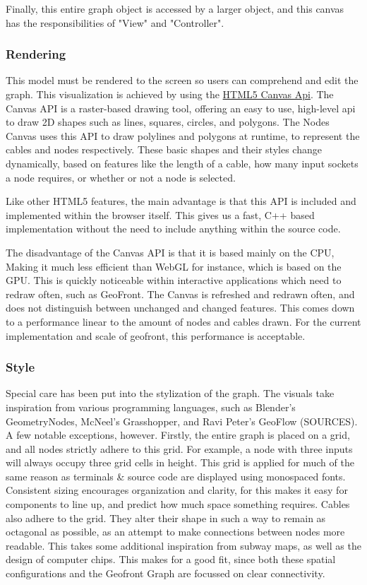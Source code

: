 Finally, this entire graph object is accessed by a larger  object, and this canvas has the responsibilities of "View" and "Controller". 

\subsubsection*{ Rendering }
This model must be rendered to the screen so users can comprehend and edit the graph. 
This visualization is achieved by using the \href{https://developer.mozilla.org/en-US/docs/Web/API/Canvas_API}{HTML5 Canvas Api}. 
The Canvas API is a raster-based drawing tool, offering an easy to use, high-level api to draw 2D shapes such as lines, squares, circles, and polygons. 
The Nodes Canvas uses this API to draw polylines and polygons at runtime, to represent the cables and nodes respectively. 
These basic shapes and their styles change dynamically, based on features like the length of a cable, how many input sockets a node requires, or whether or not a node is selected. 

Like other HTML5 features, the main advantage is that this API is included and implemented within the browser itself. This gives us a fast, C++ based implementation without the need to include anything within the source code.

The disadvantage of the Canvas API is that it is based mainly on the CPU, Making it much less efficient than WebGL for instance, which is based on the GPU. 
This is quickly noticeable within interactive applications which need to redraw often, such as GeoFront. 
The Canvas is refreshed and redrawn often, and does not distinguish between unchanged and changed features. 
This comes down to a performance linear to the amount of nodes and cables drawn. For the current implementation and scale of geofront, this performance is acceptable. 

\subsubsection*{ Style }
Special care has been put into the stylization of the graph.
The visuals take inspiration from various programming languages, such as Blender's GeometryNodes, McNeel's Grasshopper, and Ravi Peter's GeoFlow (SOURCES). 
A few notable exceptions, however. 
Firstly, the entire graph is placed on a grid, and all nodes strictly adhere to this grid. 
For example, a node with three inputs will always occupy three grid cells in height. 
This grid is applied for much of the same reason as terminals \& source code are displayed using monospaced fonts. 
Consistent sizing encourages organization and clarity, for this makes it easy for components to line up, and predict how much space something requires.  
Cables also adhere to the grid. They alter their shape in such a way to remain as octagonal as possible, as an attempt to make connections between nodes more readable.
This takes some additional inspiration from subway maps, as well as the design of computer chips. This makes for a good fit, since both these spatial configurations and the Geofront Graph are focussed on clear connectivity.

